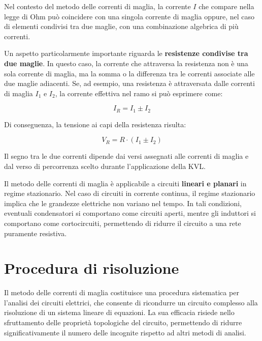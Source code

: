 Nel contesto del metodo delle correnti di maglia, la corrente $I$ che compare nella legge di Ohm può coincidere con una singola corrente di maglia oppure, nel caso di elementi condivisi tra due maglie, con una combinazione algebrica di più correnti.

Un aspetto particolarmente importante riguarda le \textbf{resistenze condivise tra due maglie}. In questo caso, la corrente che attraversa la resistenza non è una sola corrente di maglia, ma la somma o la differenza tra le correnti associate alle due maglie adiacenti. Se, ad esempio, una resistenza è attraversata dalle correnti di maglia $I_1$ e $I_2$, la corrente effettiva nel ramo si può esprimere come:

\begin{equation}
I_R = I_1 \pm I_2
\label{eq:res_condivisa}
\end{equation}

Di conseguenza, la tensione ai capi della resistenza risulta:

\begin{equation}
V_R = R \cdot (I_1 \pm I_2)
\label{eq:tensione_condivisa}
\end{equation}

Il segno tra le due correnti dipende dai versi assegnati alle correnti di maglia e dal verso di percorrenza scelto durante l'applicazione della KVL.

Il metodo delle correnti di maglia è applicabile a circuiti \textbf{lineari e planari} in regime stazionario. Nel caso di circuiti in corrente continua, il regime stazionario implica che le grandezze elettriche non variano nel tempo. In tali condizioni, eventuali condensatori si comportano come circuiti aperti, mentre gli induttori si comportano come cortocircuiti, permettendo di ridurre il circuito a una rete puramente resistiva.

\begin{center}
\end{center}



\section{Procedura di risoluzione}
Il metodo delle correnti di maglia costituisce una procedura sistematica per l'analisi dei circuiti elettrici, che consente di ricondurre un circuito complesso alla risoluzione di un sistema lineare di equazioni. La sua efficacia risiede nello sfruttamento delle proprietà topologiche del circuito, permettendo di ridurre significativamente il numero delle incognite rispetto ad altri metodi di analisi.

